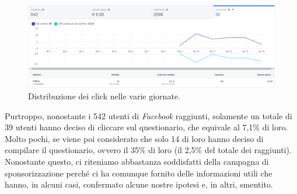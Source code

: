 \begin{figure}[!h]
    \centering
    \includegraphics[width=0.9\columnwidth]{assets/images/ricerca-etnografica/post-facebook-statistiche-click}
    \caption{Distribuzione dei click nelle varie giornate.}
\end{figure}
\noindent
Purtroppo, nonostante i 542 utenti di \textit{Facebook} raggiunti, solamente un totale di 39 utenti hanno deciso di cliccare sul questionario, che equivale al 7,1\% di loro. Molto pochi, se viene poi considerato che solo 14 di loro hanno deciso di compilare il questionario, ovvero il 35\% di loro (il 2,5\% del totale dei raggiunti).\\
Nonostante questo, ci riteniamo abbastanza soddisfatti della campagna di sponsorizzazione perché ci ha comunque fornito delle informazioni utili che hanno, in alcuni casi, confermato alcune nostre ipotesi e, in altri, smentito.

